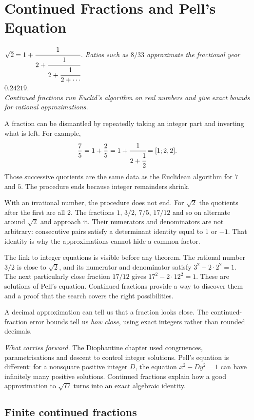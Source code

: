 \chapter{Continued Fractions and Pell's Equation}\label{ch:continued}

\begin{center}\itshape
$\sqrt2=1+\cfrac1{2+\cfrac1{2+\cfrac1{2+\cdots}}}$. Ratios such as $8/33$ approximate the fractional year $0.24219$.\\
Continued fractions run Euclid's algorithm on real numbers and give exact bounds for rational approximations.
\end{center}


A fraction can be dismantled by repeatedly taking an integer part and inverting what is left. For example,
\[
\frac{7}{5}=1+\frac{2}{5}
=1+\cfrac{1}{2+\cfrac12}
=[1;2,2].
\]
Those successive quotients are the same data as the Euclidean algorithm for $7$ and $5$. The procedure ends because integer remainders shrink.

With an irrational number, the procedure does not end. For $\sqrt2$ the quotients after the first are all $2$. The fractions $1$, $3/2$, $7/5$, $17/12$ and so on alternate around $\sqrt2$ and approach it. Their numerators and denominators are not arbitrary: consecutive pairs satisfy a determinant identity equal to $1$ or $-1$. That identity is why the approximations cannot hide a common factor.

The link to integer equations is visible before any theorem. The rational number $3/2$ is close to $\sqrt2$, and its numerator and denominator satisfy $3^2-2\cdot2^2=1$. The next particularly close fraction $17/12$ gives $17^2-2\cdot12^2=1$. These are solutions of Pell's equation. Continued fractions provide a way to discover them and a proof that the search covers the right possibilities.

A decimal approximation can tell us that a fraction looks close. The continued-fraction error bounds tell us \emph{how close}, using exact integers rather than rounded decimals.


\noindent\emph{What carries forward.} The Diophantine chapter used congruences, parametrisations and descent to control integer solutions. Pell's equation is different: for a nonsquare positive integer $D$, the equation $x^2-Dy^2=1$ can have infinitely many positive solutions. Continued fractions explain how a good approximation to $\sqrt D$ turns into an exact algebraic identity.

\section{Finite continued fractions}

